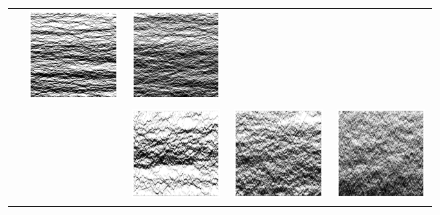 \begin{figure}
\begin{center}
\begin{tabular}{c @{\hskip -0.5em} c| c @{\hskip -0.5em} c @{\hskip -0.5em} c}
 & \includegraphics[width=0.31\linewidth]{numerics/images/stickyParticleFlows/flowImpL0p15T1p0.png} 
 & \includegraphics[width=0.31\linewidth]{numerics/images/stickyParticleFlows/flowImpL0p35T1p0.png} \\
\raisebox{5em}{256} & & \includegraphics[width=0.31\linewidth]{numerics/images/stickyParticleFlows/flowImpL0p05T8p0.png} 
 & \includegraphics[width=0.31\linewidth]{numerics/images/stickyParticleFlows/flowImpL0p15T8p0.png} 
 & \includegraphics[width=0.31\linewidth]{numerics/images/stickyParticleFlows/flowImpL0p35T8p0.png} \\ 

\end{tabular}
\end{center}
\end{figure}
